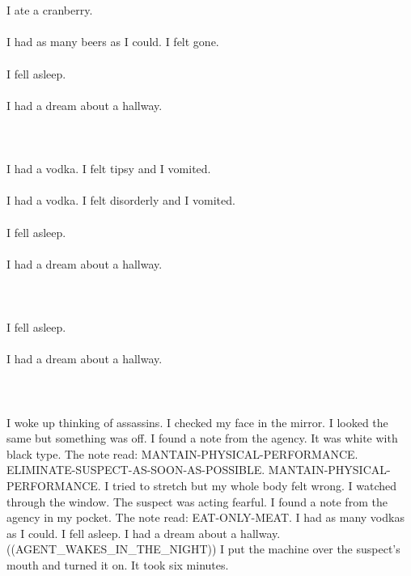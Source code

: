 \documentclass{article}
\begin{document}
    \section{}
    I ate a cranberry.\\\\I had as many beers as I could. I felt gone.\\\\I fell asleep.\\\\I had a dream about a hallway.\\\\ 
    \newpage
    
    \section{}
    I had a vodka. I felt tipsy and I vomited.\\\\I had a vodka. I felt disorderly and I vomited.\\\\I fell asleep.\\\\I had a dream about a hallway.\\\\ 
    \newpage
    
    \section{}
    I fell asleep.\\\\I had a dream about a hallway.\\\\ 
    \newpage
    
    \section{}
    I woke up thinking of assassins. I checked my face in the mirror. I looked the same but something was off. I found a note from the agency. It was white with black type. The note read: MANTAIN-PHYSICAL-PERFORMANCE. ELIMINATE-SUSPECT-AS-SOON-AS-POSSIBLE. MANTAIN-PHYSICAL-PERFORMANCE. I tried to stretch but my whole body felt wrong. I watched through the window. The suspect was acting fearful. I found a note from the agency in my pocket. The note read: EAT-ONLY-MEAT. I had as many vodkas as I could. I fell asleep. I had a dream about a hallway. ((AGENT_WAKES_IN_THE_NIGHT)) I put the machine over the suspect's mouth and turned it on. It took six minutes. \\\\
    \newpage
    
\end{document}
